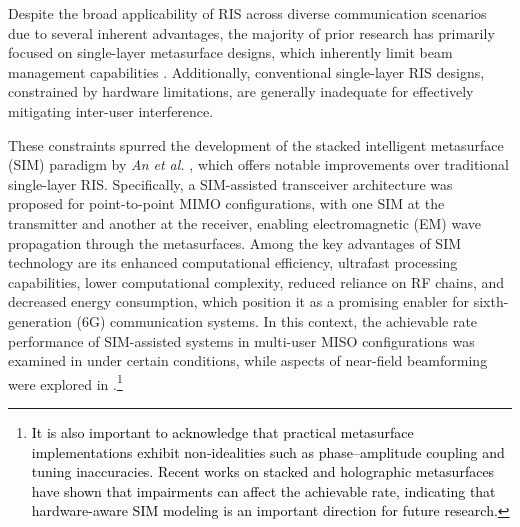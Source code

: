 \documentclass[twocolumn,10pt]{IEEEtran}
\begin{document}
	Despite the broad applicability of RIS across diverse communication scenarios due to several inherent advantages, the majority of prior research has primarily focused on single-layer metasurface designs, which inherently limit beam management capabilities \cite{Guo2020a}. Additionally, conventional single-layer RIS designs, constrained by hardware limitations, are generally inadequate for effectively mitigating inter-user interference. 
	
	These constraints spurred the development of the stacked intelligent metasurface (SIM) paradigm  by \textit{An et al.} \cite{An2023}, which offers notable improvements over traditional single-layer RIS. Specifically, a SIM-assisted transceiver architecture was proposed for point-to-point MIMO configurations, with one SIM at the transmitter and another at the receiver, enabling electromagnetic (EM) wave propagation through the metasurfaces. Among the key advantages of SIM technology are its enhanced computational efficiency, ultrafast processing capabilities, lower computational complexity, reduced reliance on RF chains, and decreased energy consumption, which position it as a promising enabler for sixth-generation (6G) communication systems. 	 In this context, the achievable rate performance of SIM-assisted systems in multi-user MISO configurations was examined in \cite{Papazafeiropoulos2024, Papazafeiropoulos2024b} under certain conditions, while aspects of near-field beamforming were explored in \cite{Papazafeiropoulos2024c}.\footnote{\textcolor{black}{It is also important to acknowledge that practical metasurface implementations
			exhibit non-idealities such as phase–amplitude coupling and tuning
			inaccuracies. Recent works on stacked and holographic metasurfaces
			\cite{Li2024,Li2025} have shown that  impairments
			can affect the achievable rate, indicating that hardware-aware SIM modeling
			is an important direction for future research.}}
	
\end{document}
